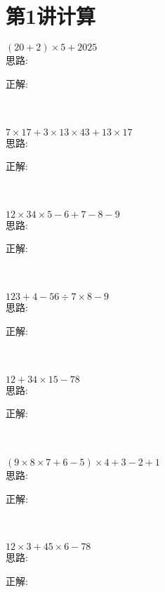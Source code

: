 \section{第1讲\quad 计算}

\item {
    $(20+2)\times 5 + 2025$ 
    \ifshowSolution
        \fangsong{}
        \\
        思路:

        正解: 
    \else
        \\ \\ \\
    \fi
}

\item {
    $7\times 17 + 3\times 13\times 43 + 13\times 17$
    \ifshowSolution
        \fangsong{}
        \\
        思路:

        正解: 
    \else
        \\ \\ \\
    \fi
}

\item {
    $12\times 34\times 5 - 6 + 7 - 8 - 9$
    \ifshowSolution
        \fangsong{}
        \\
        思路:

        正解: 
    \else
        \\ \\ \\
    \fi
}

\item {
    $123 + 4 - 56\div 7\times 8 - 9$
    \ifshowSolution
        \fangsong{}
        \\
        思路:

        正解: 
    \else
        \\ \\ \\
    \fi
}

\item {
    $12 + 34\times 15 -78$
    \ifshowSolution
        \fangsong{}
        \\
        思路:

        正解: 
    \else
        \\ \\ \\
    \fi
}


\item {
    $(9\times 8\times 7 + 6 - 5)\times 4 + 3 -2 +1$
    \ifshowSolution
        \fangsong{}
        \\
        思路:

        正解: 
    \else
        \\ \\ \\
    \fi
}
\item {
    $12\times 3 + 45\times 6 - 78$
    \ifshowSolution
        \fangsong{}
        \\
        思路:

        正解: 
    \else
        \\ \\ \\
    \fi
}

